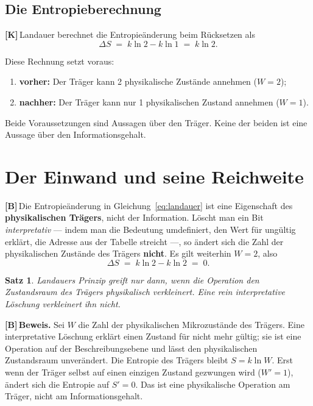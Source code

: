 \documentclass[11pt,a4paper]{article}
\newcommand{\LK}{\textcolor{layK}{\textbf{\footnotesize\textsf{[K]}}}\,}
\newcommand{\LB}{\textcolor{layB}{\textbf{\footnotesize\textsf{[B]}}}\,}
\newcommand{\qedsq}{\raisebox{0.03em}{\framebox[0.62em]{\rule{0pt}{0.42em}}}}
\theoremstyle{ffgft}
\newtheorem{satz}{Satz}
\begin{document}
\subsection{Die Entropieberechnung}

\LK Landauer berechnet die Entropieänderung beim Rücksetzen als
\begin{equation}
  \Delta S \;=\; k \ln 2 - k \ln 1 \;=\; k \ln 2 .
  \label{eq:landauer}
\end{equation}

Diese Rechnung setzt voraus:
\begin{enumerate}[leftmargin=1.6em,itemsep=0.2em]
  \item \textbf{vorher:} Der Träger kann 2 physikalische Zustände annehmen ($W=2$);
  \item \textbf{nachher:} Der Träger kann nur 1 physikalischen Zustand annehmen
        ($W=1$).
\end{enumerate}

Beide Voraussetzungen sind Aussagen über den Träger. Keine der beiden ist eine
Aussage über den Informationsgehalt.

\section{Der Einwand und seine Reichweite}

\LB Die Entropieänderung in Gleichung~\eqref{eq:landauer} ist eine Eigenschaft des
\textbf{physikalischen Trägers}, nicht der Information. Löscht man ein Bit
\emph{interpretativ} --- indem man die Bedeutung umdefiniert, den Wert für
ungültig erklärt, die Adresse aus der Tabelle streicht ---, so ändert sich die
Zahl der physikalischen Zustände des Trägers \textbf{nicht}. Es gilt weiterhin
$W = 2$, also
\begin{equation}
  \Delta S \;=\; k \ln 2 - k \ln 2 \;=\; 0 .
  \label{eq:interpretativ}
\end{equation}

\begin{satz}
Landauers Prinzip greift nur dann, wenn die Operation den Zustandsraum des Trägers
physikalisch verkleinert. Eine rein interpretative Löschung verkleinert ihn nicht.
\end{satz}

\LB \textbf{Beweis.} Sei $W$ die Zahl der physikalischen Mikrozustände des
Trägers. Eine interpretative Löschung erklärt einen Zustand für nicht mehr gültig;
sie ist eine Operation auf der Beschreibungsebene und lässt den physikalischen
Zustandsraum unverändert. Die Entropie des Trägers bleibt $S = k\ln W$. Erst wenn
der Träger selbst auf einen einzigen Zustand gezwungen wird ($W' = 1$), ändert sich
die Entropie auf $S' = 0$. Das ist eine physikalische Operation am Träger, nicht am
Informationsgehalt. \hfill\qedsq
\end{document}
